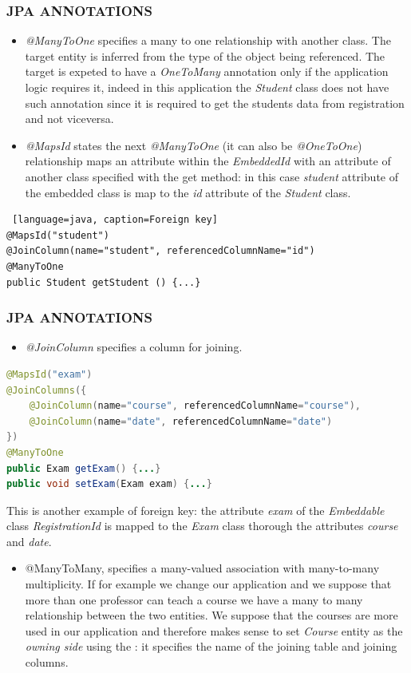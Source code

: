 \documentclass{beamer}
\begin{document}
\begin{frame} [fragile]
	\frametitle{JPA ANNOTATIONS}
	\begin{itemize}
		\item \textit{@ManyToOne} specifies a many to one relationship with another class. The target entity is inferred from the type of the object being referenced. The target is expeted to have a \textit{OneToMany} annotation only if the application logic requires it, indeed in this application the \textit{Student} class does not have such annotation since it is required to get the students data from registration and not viceversa.
		\item \textit{@MapsId} states the next \textit{@ManyToOne} (it can also be \textit{@OneToOne}) relationship maps an attribute within the \textit{EmbeddedId} with an attribute of another class specified with the get method: in this case \textit{student} attribute of the embedded class is map to the \textit{id} attribute of the \textit{Student} class.
	\end{itemize}
	\begin{lstlisting} [language=java, caption=Foreign key]
@MapsId("student")
@JoinColumn(name="student", referencedColumnName="id")
@ManyToOne
public Student getStudent () {...}\end{lstlisting}
\end{frame}

\begin{frame} [fragile]
	\frametitle{JPA ANNOTATIONS}
	\begin{itemize}
		\item \textit{@JoinColumn} specifies a column for joining.
	\end{itemize}
	\begin{lstlisting}[language=java, caption=Foreign key]
@MapsId("exam")
@JoinColumns({
	@JoinColumn(name="course", referencedColumnName="course"),
	@JoinColumn(name="date", referencedColumnName="date")
})
@ManyToOne
public Exam getExam() {...}
public void setExam(Exam exam) {...}\end{lstlisting}
This is another example of foreign key: the attribute \textit{exam} of the \textit{Embeddable} class \textit{RegistrationId} is mapped to the \textit{Exam} class thorough the attributes \textit{course} and \textit{date}.
\end{frame}


\begin{frame} [fragile]
\begin{itemize}
\frametitle{JPA ANNOTATIONS}
\item @ManyToMany, specifies a many-valued association with many-to-many multiplicity.  If for example we change our application and we suppose that more than one professor can teach a course we have a many to many relationship between the two entities. We suppose that the courses are more used in our application and therefore makes sense to set \textit{Course} entity as the \textit{owning side} using the : it specifies the name of the joining table and joining columns.
\end{itemize}
\end{frame}
\end{document}
